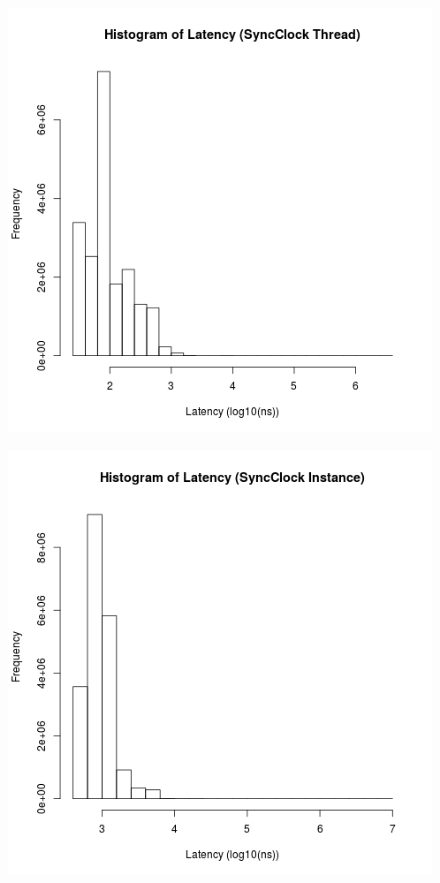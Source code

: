 \begin{figure}
\center
\includegraphics[height=.4\textheight]{sync_thread_latency_hist.png}
\caption{\label{sync_thread_latency}}
\end{figure}

\begin{figure}
\center
\includegraphics[height=.4\textheight]{sync_instance_latency_hist.png}
\caption{\label{sync_instance_latency}}
\end{figure}

